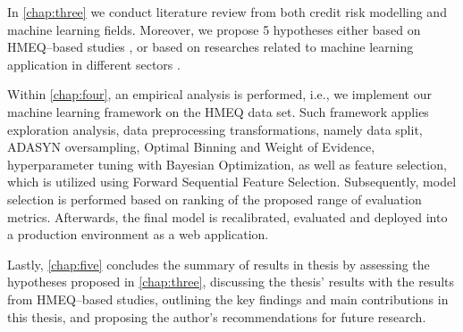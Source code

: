 In \autoref{chap:three} we conduct literature review from both credit risk modelling and machine learning fields. Moreover, we propose 5 hypotheses either based on HMEQ--based studies \citep{serkan2021bagging, zurada2014classification}, or based on researches related to machine learning application in different sectors \citep{de2023predicting, pintelas2020grey, wu2018accurate}.

Within \autoref{chap:four}, an empirical analysis is performed, i.e., we implement our machine learning framework on the HMEQ data set.
Such framework applies exploration analysis, data preprocessing transformations, namely data split, ADASYN oversampling, Optimal Binning and Weight of Evidence, hyperparameter tuning with Bayesian Optimization, as well as feature selection, which is utilized using Forward Sequential Feature Selection.
Subsequently, model selection is performed based on ranking of the proposed range of evaluation metrics.
Afterwards, the final model is recalibrated, evaluated and deployed into a production environment as a web application.

Lastly, \autoref{chap:five} concludes the summary of results in thesis by assessing the hypotheses proposed in \autoref{chap:three}, discussing the thesis' results  with the results from HMEQ--based studies, outlining the key findings and main contributions in this thesis, and proposing the author's recommendations for future research. 

